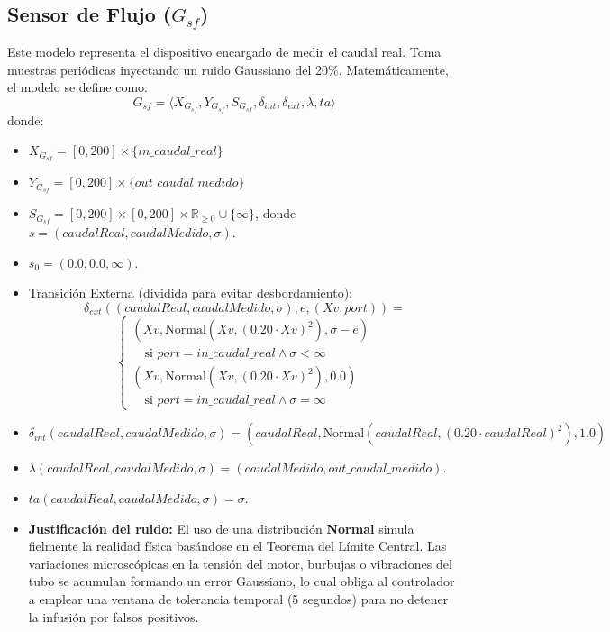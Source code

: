 \subsection{Sensor de Flujo ($G_{sf}$)}
Este modelo representa el dispositivo encargado de medir el caudal real. Toma muestras periódicas inyectando un ruido Gaussiano del 20\%.
Matemáticamente, el modelo se define como:
\[ G_{sf} = \langle X_{G_{sf}}, Y_{G_{sf}}, S_{G_{sf}}, \delta_{int}, \delta_{ext}, \lambda, ta \rangle \]
donde:
\begin{itemize}
    \item $X_{G_{sf}} = [0, 200] \times \{in\_caudal\_real\}$
    \item $Y_{G_{sf}} = [0, 200] \times \{out\_caudal\_medido\}$
    \item $S_{G_{sf}} = [0, 200] \times [0, 200] \times \mathbb{R}_{\geq 0} \cup \{\infty\}$, donde $s = (caudalReal, caudalMedido, \sigma)$.
    \item $s_0 = (0.0, 0.0, \infty)$.
    \item Transición Externa (dividida para evitar desbordamiento):
    \[
    \delta_{ext}((caudalReal, caudalMedido, \sigma), e, (Xv, port)) = 
    \]
    \[
    \begin{cases} 
    (Xv, \text{Normal}(Xv, (0.20 \cdot Xv)^2), \sigma - e) \\ 
    \quad \text{si } port = in\_caudal\_real \land \sigma < \infty \\[2ex]
    (Xv, \text{Normal}(Xv, (0.20 \cdot Xv)^2), 0.0) \\ 
    \quad \text{si } port = in\_caudal\_real \land \sigma = \infty
    \end{cases}
    \]
    \item $\delta_{int}(caudalReal, caudalMedido, \sigma) = (caudalReal, \text{Normal}(caudalReal, (0.20 \cdot caudalReal)^2), 1.0)$
    \item $\lambda(caudalReal, caudalMedido, \sigma) = (caudalMedido, out\_caudal\_medido)$.
    \item $ta(caudalReal, caudalMedido, \sigma) = \sigma$.
    \item \textbf{Justificación del ruido:} El uso de una distribución \textbf{Normal} simula fielmente la realidad física basándose en el Teorema del Límite Central. Las variaciones microscópicas en la tensión del motor, burbujas o vibraciones del tubo se acumulan formando un error Gaussiano, lo cual obliga al controlador a emplear una ventana de tolerancia temporal (5 segundos) para no detener la infusión por falsos positivos.
\end{itemize}

